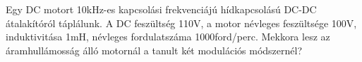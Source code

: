 \begin{example}

Egy DC motort 10kHz-es kapcsolási frekvenciájú hídkapcsolású DC-DC átalakítóról táplálunk. A DC feszültség 110V, a motor névleges feszültsége 100V, induktivitása 1mH, névleges fordulatszáma 1000ford/perc. Mekkora lesz az áramhullámosság álló motornál a tanult két modulációs módszernél?

\tcbline
\vspace{1mm}

\solution

\end{example}